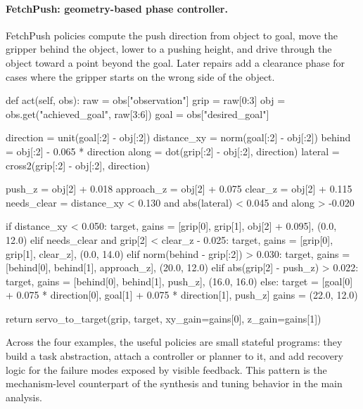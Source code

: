 \paragraph{FetchPush: geometry-based phase controller.}
FetchPush policies compute the push direction from object to goal, move the
gripper behind the object, lower to a pushing height, and drive through the
object toward a point beyond the goal. Later repairs add a clearance phase for
cases where the gripper starts on the wrong side of the object.
\begin{strategycode}
def act(self, obs):
    raw = obs["observation"]
    grip = raw[0:3]
    obj = obs.get("achieved_goal", raw[3:6])
    goal = obs["desired_goal"]

    direction = unit(goal[:2] - obj[:2])
    distance_xy = norm(goal[:2] - obj[:2])
    behind = obj[:2] - 0.065 * direction
    along = dot(grip[:2] - obj[:2], direction)
    lateral = cross2(grip[:2] - obj[:2], direction)

    push_z = obj[2] + 0.018
    approach_z = obj[2] + 0.075
    clear_z = obj[2] + 0.115
    needs_clear = distance_xy < 0.130 and abs(lateral) < 0.045 and along > -0.020

    if distance_xy < 0.050:
        target, gains = [grip[0], grip[1], obj[2] + 0.095], (0.0, 12.0)
    elif needs_clear and grip[2] < clear_z - 0.025:
        target, gains = [grip[0], grip[1], clear_z], (0.0, 14.0)
    elif norm(behind - grip[:2]) > 0.030:
        target, gains = [behind[0], behind[1], approach_z], (20.0, 12.0)
    elif abs(grip[2] - push_z) > 0.022:
        target, gains = [behind[0], behind[1], push_z], (16.0, 16.0)
    else:
        target = [goal[0] + 0.075 * direction[0],
                  goal[1] + 0.075 * direction[1], push_z]
        gains = (22.0, 12.0)

    return servo_to_target(grip, target, xy_gain=gains[0], z_gain=gains[1])
\end{strategycode}

Across the four examples, the useful policies are small stateful programs:
they build a task abstraction, attach a controller or planner to it, and add
recovery logic for the failure modes exposed by visible feedback. This pattern
is the mechanism-level counterpart of the synthesis and tuning behavior in the
main analysis.
